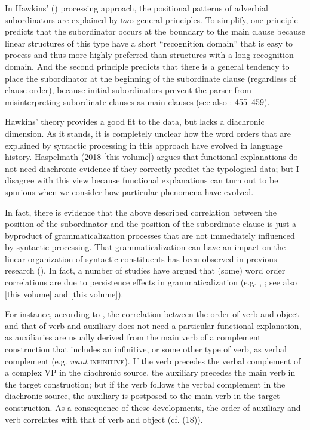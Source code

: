 \documentclass[output=paper]{langsci/langscibook}
\begin{document}
In Hawkins’ (\citeyear{Hawkins1994,Hawkins2004}) processing approach, the positional patterns of adverbial subordinators are explained by two general principles. To simplify, one principle predicts that the subordinator occurs at the boundary to the main clause because linear structures of this type have a short “recognition domain” that is easy to process and thus more highly preferred than structures with a long recognition domain. And the second principle predicts that there is a general tendency to place the subordinator at the beginning of the subordinate clause (regardless of clause order), because initial subordinators prevent the parser from misinterpreting subordinate clauses as main clauses (see also \citealt{Diessel2005}: 455--459).

Hawkins’ theory provides a good fit to the data, but lacks a diachronic dimension. As it stands, it is completely unclear how the word orders that are explained by syntactic processing in this approach have evolved in language history. Haspelmath (2018 [this volume]) argues that functional explanations do not need diachronic evidence if they correctly predict the typological data; but I disagree with this view because functional explanations can turn out to be spurious when we consider how particular phenomena have evolved.

In fact, there is evidence that the above described correlation between the position of the subordinator and the position of the subordinate clause is just a byproduct of grammaticalization processes that are not immediately influenced by syntactic processing. That grammaticalization can have an impact on the linear organization of syntactic constituents has been observed in previous research (\citealt{LiThompson1974}). In fact, a number of studies have argued that (some) word order correlations are due to persistence effects in grammaticalization (e.g. \citealt{Givón1975}, \citealt{Aristar1991,Bybee2010,Collins2012}; see also \citealt{Collins2018} [this volume] and \citealt{Dryer2018} [this volume]). 

For instance, according to \citet[111]{Bybee2010}, the correlation between the order of verb and object and that of verb and auxiliary does not need a particular functional explanation, as auxiliaries are usually derived from the main verb of a complement construction that includes an infinitive, or some other type of verb, as verbal complement (e.g. \textit{want} \textsc{infinitive}). If the verb precedes the verbal complement of a complex VP in the diachronic source, the auxiliary precedes the main verb in the target construction; but if the verb follows the verbal complement in the diachronic source, the auxiliary is postposed to the main verb in the target construction. As a consequence of these developments, the order of auxiliary and verb correlates with that of verb and object (cf. (18)).
\end{document}
